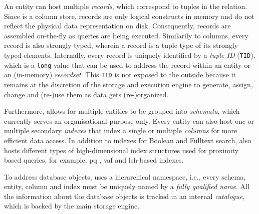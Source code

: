 An entity can host multiple \emph{records}, which correspond to tuples in the relation. Since \cottontail{} is a column store, records are only logical constructs in memory and do not reflect the physical data representation on disk. Consequently, records are assembled on-the-fly as queries are being executed. Similarily to columns, every record is also strongly typed, wherein a record is a tuple type of its strongly typed elements. Internally, every record is uniquely identified by a \emph{tuple ID} (\texttt{TID}), which is a \texttt{long} value that can be used to address the record within an entity or an (in-memory) \emph{recordset}. This \texttt{TID} is not exposed to the outside because it remains at the discretion of the storage and execution engine to generate, assign, change and (re-)use them as data gets (re-)organized.

Furthermore, \cottontail{} allows for multiple entities to be grouped into \emph{schemata}, which currently serves an organisational purpose only. Every entity can also host one or multiple secondary \emph{indexes} that index a single or multiple \emph{columns} for more efficient data access. In addition to indexes for Boolean and Fulltext search, \cottontail{} also hosts different types of high-dimensional index structures used for proximity based queries, for example, \acrshort{pq} \cite{Jegou:2010Product}, \acrshort{vaf} \cite{Weber:1998Va} and \acrshort{lsh}-based \cite{Indyk1998:Approximate} indexes.

To address database objects, \cottontail{} uses a hierarchical namespace, i.e., every schema, entity, column and index must be uniquely named by a \emph{fully qualified name}. All the information about the database objects is tracked in an internal \emph{catalogue}, which is backed by the main storage engine.

